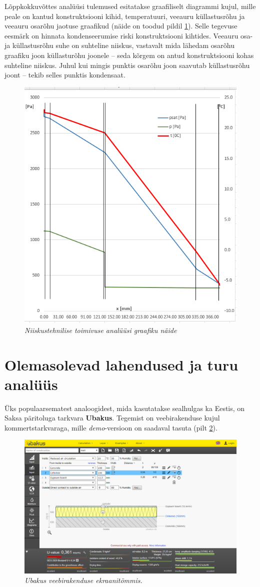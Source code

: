 Lõppkokkuvõttes analüüsi tulemused esitatakse graafiliselt diagrammi kujul, mille peale on kantud konstruktsiooni 
kihid, temperatuuri, veeauru küllastusrõhu ja veeauru osarõhu jaotuse graafikud (näide on toodud pildil \ref{fig:excel_graph_sample}). 
Selle tegevuse eesmärk on hinnata kondenseerumise riski konstruktsiooni kihtides. Veeauru osa- ja küllastusrõhu 
suhe on suhteline niiskus, vastavalt mida lähedam osarõhu graafiku joon küllasturõhu joonele -- seda kõrgem on 
antud konstruktsiooni kohas suhteline niiskus. Juhul kui mingis punktis osarõhu joon saavutab küllastusrõhu 
joont -- tekib selles punktis kondensaat. 

\begin{figure}[ht]
    \centering
    \includegraphics[width=.6\textwidth]{figures/problem_statement/05_excel_grafic_sample.png}
    \caption{\textit{Niiskustehnilise toimivuse analüüsi graafiku näide}}
    \label{fig:excel_graph_sample}
\end{figure}



\section{Olemasolevad lahendused ja turu analüüs}
Üks populaarsematest analoogidest, mida kasutatakse sealhulgas ka Eestis, on Saksa päritoluga tarkvara \textbf{Ubakus}. 
Tegemist on veebirakenduse kujul kommertstarkvaraga, mille \textit{demo}-versioon on saadaval tasuta (pilt \ref{fig:ubakus_sample}). 
\begin{figure}[ht]
    \centering
    \includegraphics[width=.8\textwidth]{figures/problem_statement/01_ubakus.png}
    \caption{\textit{Ubakus veebirakenduse ekraanitõmmis.}}
    \label{fig:ubakus_sample}
\end{figure}

